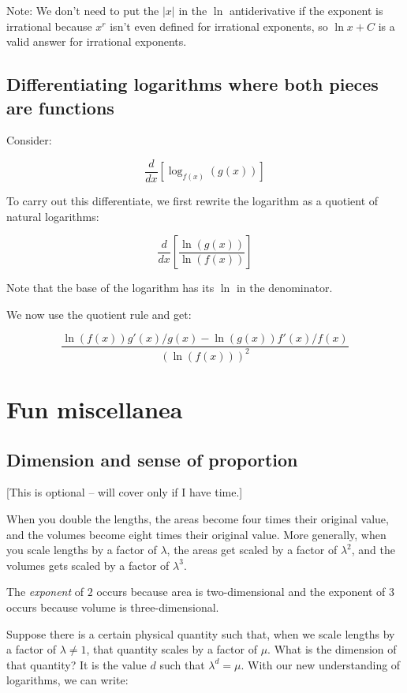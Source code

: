\documentclass[10pt]{amsart}
\begin{document}
Note: We don't need to put the $|x|$ in the $\ln$ antiderivative if
the exponent is irrational because $x^r$ isn't even defined for
irrational exponents, so $\ln x + C$ is a valid answer for irrational
exponents.

\subsection{Differentiating logarithms where both pieces are functions}

Consider:

$$\frac{d}{dx}\left[\log_{f(x)}(g(x))\right]$$

To carry out this differentiate, we first rewrite the logarithm as a
quotient of natural logarithms:

$$\frac{d}{dx} \left[\frac{\ln(g(x))}{\ln(f(x))}\right]$$

Note that the base of the logarithm has its $\ln$ in the denominator.

We now use the quotient rule and get:

$$\frac{\ln(f(x))g'(x)/g(x) - \ln(g(x))f'(x)/f(x)}{(\ln(f(x)))^2}$$

\section{Fun miscellanea}

\subsection{Dimension and sense of proportion}

[This is optional -- will cover only if I have time.]

When you double the lengths, the areas become four times their
original value, and the volumes become eight times their original
value. More generally, when you scale lengths by a factor of
$\lambda$, the areas get scaled by a factor of $\lambda^2$, and the
volumes gets scaled by a factor of $\lambda^3$.

The {\em exponent} of $2$ occurs because area is two-dimensional and
the exponent of $3$ occurs because volume is three-dimensional.

Suppose there is a certain physical quantity such that, when we scale
lengths by a factor of $\lambda \ne 1$, that quantity scales by a
factor of $\mu$. What is the dimension of that quantity? It is the
value $d$ such that $\lambda^d = \mu$. With our new understanding of
logarithms, we can write:
\end{document}
